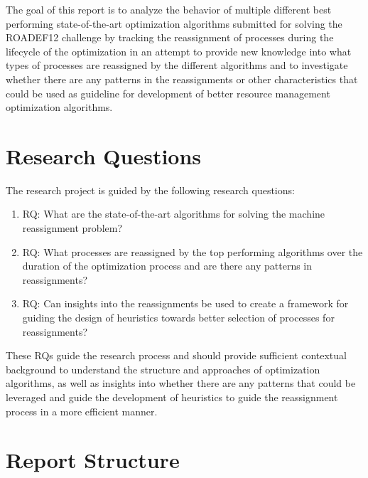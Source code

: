 \documentclass[a4paper,12pt]{Classes/RoboticsLaTeX}
\begin{document}
The goal of this report is to analyze the behavior of multiple different
best performing state-of-the-art optimization algorithms submitted for
solving the ROADEF12 challenge by tracking the reassignment of processes
during the lifecycle of the optimization in an attempt to provide new
knowledge into what types of processes are reassigned by the different
algorithms and to investigate whether there are any patterns in the
reassignments or other characteristics that could be used as guideline
for development of better resource management optimization algorithms.


\newpage
\section{Research Questions}

The research project is guided by the following research questions:

\begin{enumerate}\def\labelenumi{\arabic{enumi}.}
\item RQ: What are the state-of-the-art algorithms for solving the machine reassignment problem?
\item RQ: What processes are reassigned by the top performing algorithms over the duration of the optimization process and are there any patterns in reassignments?
\item RQ: Can insights into the reassignments be used to create a framework for guiding the design of heuristics towards better selection of processes for reassignments?
\end{enumerate}

These RQs guide the research process and should provide sufficient contextual background to understand the structure and approaches of optimization algorithms, as well as insights into whether there are any patterns that could be leveraged and guide the development of heuristics to guide the reassignment process in a more efficient manner.

\newpage
\section{Report Structure}\label{report-structure}
\end{document}
